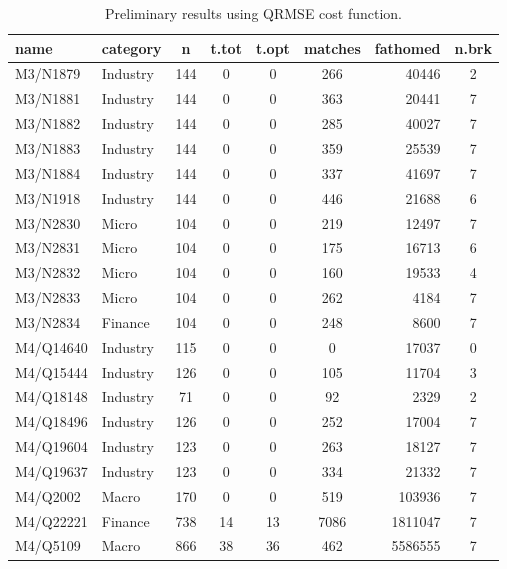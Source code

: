\documentclass[runningheads]{llncs}
\begin{document}

\begin{table}
	\caption{Preliminary results using QRMSE cost function.}\label{tab2}
	\begin{tabular}{llc|cc|cr|c}
		\hline
name      & category     & n   & t.tot & t.opt & matches & fathomed & n.brk \\
		\hline
M3/N1879  & Industry     & 144 &  0 & 0 & 266 & 40446 & 2 \\
M3/N1881  & Industry     & 144 &  0 & 0 & 363 & 20441 & 7 \\
M3/N1882  & Industry     & 144 &  0 & 0 & 285 & 40027 & 7 \\
M3/N1883  & Industry     & 144 &  0 & 0 & 359 & 25539 & 7 \\
M3/N1884  & Industry     & 144 &  0 & 0 & 337 & 41697 & 7 \\
M3/N1918  & Industry     & 144 &  0 & 0 & 446 & 21688 & 6 \\
M3/N2830  & Micro        & 104 &  0 & 0 & 219 & 12497 & 7 \\
M3/N2831  & Micro        & 104 &  0 & 0 & 175 & 16713 & 6 \\
M3/N2832  & Micro        & 104 &  0 & 0 & 160 & 19533 & 4 \\
M3/N2833  & Micro        & 104 &  0 & 0 & 262 & 4184 & 7 \\
M3/N2834  & Finance      & 104 &  0 & 0 & 248 & 8600 & 7 \\
M4/Q14640 & Industry     & 115 &  0 & 0 &   0 & 17037 & 0 \\
M4/Q15444 & Industry     & 126 &  0 & 0 & 105 & 11704 & 3 \\
M4/Q18148 & Industry     &  71 &  0 & 0 &  92 & 2329 & 2 \\
M4/Q18496 & Industry     & 126 &  0 & 0 & 252 & 17004 & 7 \\
M4/Q19604 & Industry     & 123 &  0 & 0 & 263 & 18127 & 7 \\
M4/Q19637 & Industry     & 123 &  0 & 0 & 334 & 21332 & 7 \\
M4/Q2002  & Macro        & 170 &  0 & 0 & 519 & 103936 & 7 \\
M4/Q22221 & Finance      & 738 & 14 &13 &7086 & 1811047 & 7 \\
M4/Q5109  & Macro        & 866 & 38 &36 & 462 & 5586555 & 7 \\

\end{tabular}
\end{table}
\end{document}
